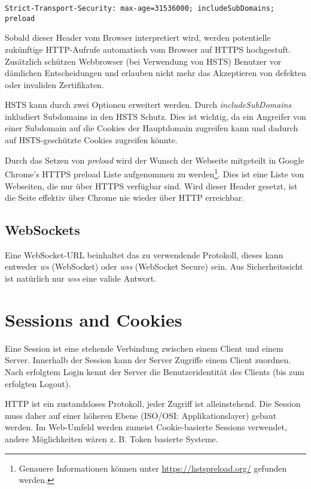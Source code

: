 \begin{verbatim}
Strict-Transport-Security: max-age=31536000; includeSubDomains; preload
\end{verbatim}

Sobald dieser Header vom Browser interpretiert wird, werden potentielle zukünftige HTTP-Aufrufe automatisch vom Browser auf HTTPS hochgestuft. Zusätzlich schützen Webbrowser (bei Verwendung von HSTS) Benutzer vor dämlichen Entscheidungen und erlauben nicht mehr das Akzeptieren von defekten oder invaliden Zertifikaten.

HSTS kann durch zwei Optionen erweitert werden. Durch \textit{includeSubDomains} inkludiert Subdomains in den HSTS Schutz. Dies ist wichtig, da ein Angreifer von einer Subdomain auf die Cookies der Hauptdomain zugreifen kann und dadurch auf HSTS-geschützte Cookies zugreifen könnte.

Durch das Setzen von \textit{preload} wird der Wunsch der Webseite mitgeteilt in Google Chrome's HTTPS preload Liste aufgenommen zu werden\footnote{Genauere Informationen können unter \url{https://hstspreload.org/} gefunden werden.}. Dies ist eine Liste von Webseiten, die nur über HTTPS verfügbar sind. Wird dieser Header gesetzt, ist die Seite effektiv über Chrome nie wieder über HTTP erreichbar.

\subsection{WebSockets}

Eine WebSocket-URL beinhaltet das zu verwendende Protokoll, dieses kann entweder \textit{ws} (WebSocket) oder \textit{wss} (WebSocket Secure) sein. Aus Sicherheitssicht ist natürlich nur \textit{wss} eine valide Antwort.


\section{Sessions and Cookies}

Eine Session ist eine stehende Verbindung zwischen einem Client und einem Server. Innerhalb der Session kann der Server Zugriffe einem Client zuordnen. Nach erfolgtem Login kennt der Server die Benutzeridentität des Clients (bis zum erfolgten Logout).

HTTP ist ein zustandsloses Protokoll, jeder Zugriff ist alleinstehend. Die Session muss daher auf einer höheren Ebene (ISO/OSI: Applikationslayer) gebaut werden. Im Web-Umfeld werden zumeist Cookie-basierte Sessions verwendet, andere Möglichkeiten wären z. B. Token basierte Systeme.

